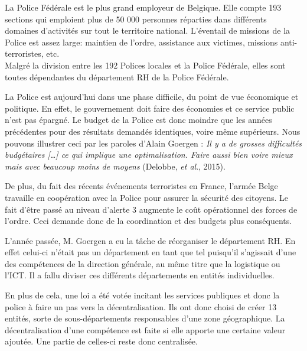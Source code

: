 La Police Fédérale est le plus grand employeur de Belgique. Elle compte 193 sections qui emploient plus de 50 000 personnes réparties dans différents domaines d'activités sur tout le territoire national. L'éventail de missions de la Police est assez large: maintien de l'ordre, assistance aux victimes, missions anti-terroristes, etc.\\
Malgré la division entre les 192 Polices locales et la Police Fédérale, elles sont toutes dépendantes du département RH de la Police Fédérale.\newline
 
La Police est aujourd'hui dans une phase difficile, du point de vue économique et politique. En effet, le gouvernement doit faire des économies et ce service public n'est pas épargné. Le budget de la Police est donc moindre que les années précédentes %
 pour des résultats demandés identiques, voire même supérieurs. Nous pouvons illustrer ceci par les paroles d'Alain Goergen : \textit{\og Il y a de grosses difficultés budgétaires [\ldots] ce qui implique une optimalisation. Faire aussi bien voire mieux mais avec beaucoup moins de moyens \fg{}} (Delobbe, \textit{et al}., 2015). \newline

De plus, du fait des récents événements terroristes en France, l'armée Belge travaille en coopération avec la Police pour assurer la sécurité des citoyens. Le fait d'être passé au niveau d'alerte 3 augmente le coût opérationnel des forces de l'ordre. Ceci demande donc de la coordination et des budgets plus conséquents. \newline

L'année passée, M. Goergen a eu la tâche de réorganiser le département RH. En effet celui-ci n'était pas un département en tant que tel puisqu'il s'agissait d'une des compétences de la direction générale, au même titre que la logistique ou l'ICT. Il a fallu diviser ces différents départements en entités individuelles.\newline

En plus de cela, une loi a été votée incitant les services publiques et donc la police à faire un pas vers la décentralisation. Ils ont donc choisi de créer 13 entités, sorte de sous-départements responsables d'une zone géographique. La décentralisation d'une compétence est faite si elle apporte une certaine valeur ajoutée. Une partie de celles-ci reste donc centralisée.\newline

